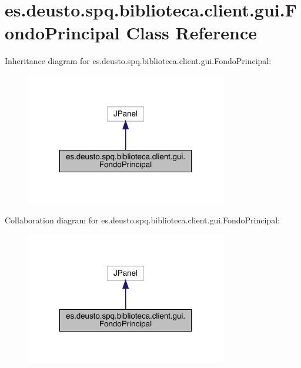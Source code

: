 \hypertarget{classes_1_1deusto_1_1spq_1_1biblioteca_1_1client_1_1gui_1_1_fondo_principal}{}\section{es.\+deusto.\+spq.\+biblioteca.\+client.\+gui.\+Fondo\+Principal Class Reference}
\label{classes_1_1deusto_1_1spq_1_1biblioteca_1_1client_1_1gui_1_1_fondo_principal}


Inheritance diagram for es.\+deusto.\+spq.\+biblioteca.\+client.\+gui.\+Fondo\+Principal\+:
\nopagebreak
\begin{figure}[H]
\begin{center}
\leavevmode
\includegraphics[width=248pt]{classes_1_1deusto_1_1spq_1_1biblioteca_1_1client_1_1gui_1_1_fondo_principal__inherit__graph}
\end{center}
\end{figure}


Collaboration diagram for es.\+deusto.\+spq.\+biblioteca.\+client.\+gui.\+Fondo\+Principal\+:
\nopagebreak
\begin{figure}[H]
\begin{center}
\leavevmode
\includegraphics[width=248pt]{classes_1_1deusto_1_1spq_1_1biblioteca_1_1client_1_1gui_1_1_fondo_principal__coll__graph}
\end{center}
\end{figure}
